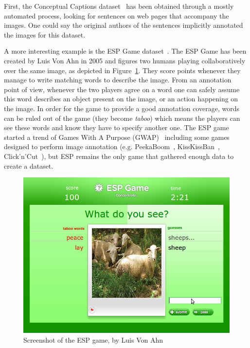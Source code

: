 First, the Conceptual Captions dataset~\cite{sharma-etal-2018-conceptual}
has been obtained through a mostly automated process,
looking for sentences on web pages that accompany the images.
One could say the original authors of the sentences
implicitly annotated the images for this dataset.


A more interesting example is the ESP Game dataset~\cite{von2005esp}.
The ESP Game has been created by Luis Von Ahn in 2005
and figures two humans playing collaboratively over the same image,
as depicted in Figure~\ref{fig:esp}.
They score points whenever they manage to write matching words to describe the image.
From an annotation point of view, whenever the two players agree
on a word one can safely assume this word describes an object present on the image,
or an action happening on the image.
In order for the game to provide a good annotation coverage,
words can be ruled out of the game (they become \textit{taboo})
which means the players can see these words and know they have to specify another one.
The ESP game started a trend of Games With A Purpose (GWAP)~\cite{von2008designing}
including some games designed to perform image annotation
(e.g. PeekaBoom~\cite{von2006peekaboom}, KissKissBan~\cite{ho2010kisskissban},
Click'n'Cut~\cite{carlier2014click}),
but ESP remains the only game that gathered enough data to create a dataset.

\begin{figure}[ht]
\centering
\includegraphics[width=0.5\columnwidth]{assets/img/esp.png}
\caption{Screenshot of the ESP game, by Luis Von Ahn~\cite{von2005esp}}%
\label{fig:esp}
\end{figure}

